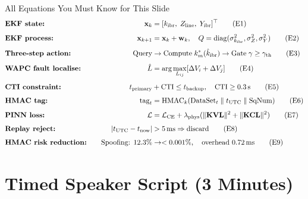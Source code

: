 \documentclass[12pt,a4paper]{article}
\newcommand{\kibr}{k_\mathrm{ibr}}
\newcommand{\kibrhat}{\hat{k}_\mathrm{ibr}}
\newcommand{\km}{k_m}
\newcommand{\gammath}{\gamma_\mathrm{th}}
\newcommand{\CTI}{\mathrm{CTI}}
\begin{document}
\begin{formulabox}{All Equations You Must Know for This Slide}
\begin{alignat}{2}
  &\text{\textbf{EKF state:}} &\quad
  \mathbf{x}_k &= [\kibr,\; Z_\mathrm{line},\; Y_\mathrm{ibr}]^\top
  \tag{E1}\label{E1}\\[4pt]
  &\text{\textbf{EKF process:}} &\quad
  \mathbf{x}_{k+1} &= \mathbf{x}_k + \mathbf{w}_k,\quad Q = \mathrm{diag}(\sigma_{k_\mathrm{ibr}}^2, \sigma_Z^2, \sigma_Y^2)
  \tag{E2}\label{E2}\\[4pt]
  &\text{\textbf{Three-step action:}} &\quad
  \text{Query} &\to \text{Compute}\;\km^*(\kibrhat) \to \text{Gate}\;\gamma\geq\gammath
  \tag{E3}\label{E3}\\[4pt]
  &\text{\textbf{WAPC fault localise:}} &\quad
  \hat{L} &= \arg\max_{L_{ij}}[\Delta V_i + \Delta V_j]
  \tag{E4}\label{E4}\\[4pt]
  &\text{\textbf{CTI constraint:}} &\quad
  t_\mathrm{primary} &+ \CTI \leq t_\mathrm{backup},\quad \CTI \geq 0.3\,\mathrm{s}
  \tag{E5}\label{E5}\\[4pt]
  &\text{\textbf{HMAC tag:}} &\quad
  \mathrm{tag}_t &= \mathrm{HMAC}_k(\mathrm{DataSet}_t \;\|\; t_\mathrm{UTC} \;\|\; \mathrm{SqNum})
  \tag{E6}\label{E6}\\[4pt]
  &\text{\textbf{PINN loss:}} &\quad
  \mathcal{L} &= \mathcal{L}_\mathrm{CE} + \lambda_\mathrm{phys}(\|\mathbf{KVL}\|^2+\|\mathbf{KCL}\|^2)
  \tag{E7}\label{E7}\\[4pt]
  &\text{\textbf{Replay reject:}} &\quad
  |t_\mathrm{UTC} - t_\mathrm{now}| &> 5\,\mathrm{ms} \Rightarrow \text{discard}
  \tag{E8}\label{E8}\\[4pt]
  &\text{\textbf{HMAC risk reduction:}} &\quad
  \text{Spoofing: } 12.3\% &\to <0.001\%,\quad\text{overhead }0.72\,\mathrm{ms}
  \tag{E9}\label{E9}
\end{alignat}
\end{formulabox}

\section{Timed Speaker Script (3 Minutes)}
\end{document}
